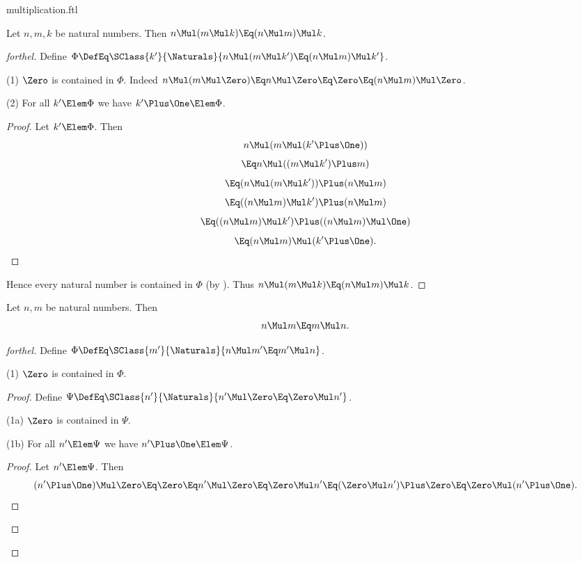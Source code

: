 \documentclass{stex}
\begin{document}
\begin{smodule}{multiplication.ftl}
\begin{proposition*}[forthel]
  Let $n, m, k$ be natural numbers.
  Then $n \Mul (m \Mul k) \Eq (n \Mul m) \Mul k$.
\end{proposition*}
\begin{proof}[forthel]
  Define $\Phi \DefEq \SClass{k'}{\Naturals}{n \Mul (m \Mul k') \Eq (n \Mul m) \Mul k'}$.

  (1) $\Zero$ is contained in $\Phi$.
  Indeed $n \Mul (m \Mul \Zero)
    \Eq n \Mul \Zero
    \Eq \Zero
    \Eq (n \Mul m) \Mul \Zero$.

  (2) For all $k' \Elem \Phi$ we have $k' \Plus \One \Elem \Phi$.
  \begin{proof}
    Let $k' \Elem \Phi$.
    Then
    \[  n \Mul (m \Mul (k' \Plus \One))                          \]
    \[    \Eq n \Mul ((m \Mul k') \Plus m)                      \]
    \[    \Eq (n \Mul (m \Mul k')) \Plus (n \Mul m)            \]
    \[    \Eq ((n \Mul m) \Mul k') \Plus (n \Mul m)            \]
    \[    \Eq ((n \Mul m) \Mul k') \Plus ((n \Mul m) \Mul \One)  \]
    \[    \Eq (n \Mul m) \Mul (k' \Plus \One).                     \]
  \end{proof}

  Hence every natural number is contained in $\Phi$ (by ).
  Thus $n \Mul (m \Mul k) \Eq (n \Mul m) \Mul k$.
\end{proof}

\begin{proposition*}[forthel,name=commutativity of multiplication]
  Let $n, m$ be natural numbers.
  Then \[ n \Mul m \Eq m \Mul n. \]
\end{proposition*}
\begin{proof}[forthel]
  Define $\Phi \DefEq \SClass{m'}{\Naturals}{n \Mul m' \Eq m' \Mul n}$.

  (1) $\Zero$ is contained in $\Phi$.
  \begin{proof}
    Define $\Psi \DefEq \SClass{n'}{\Naturals}{n' \Mul \Zero \Eq \Zero \Mul n'}$.

    (1a) $\Zero$ is contained in $\Psi$.

    (1b) For all $n' \Elem \Psi$ we have $n' \Plus \One \Elem \Psi$.
    \begin{proof}
      Let $n' \Elem \Psi$.
      Then
      \[ (n' \Plus \One) \Mul \Zero
        \Eq \Zero
        \Eq n' \Mul \Zero
        \Eq \Zero \Mul n'
        \Eq (\Zero \Mul n') \Plus \Zero
        \Eq \Zero \Mul (n' \Plus \One). \]
    \end{proof}


\end{proof}
\end{proof}
\end{smodule}
\end{document}
